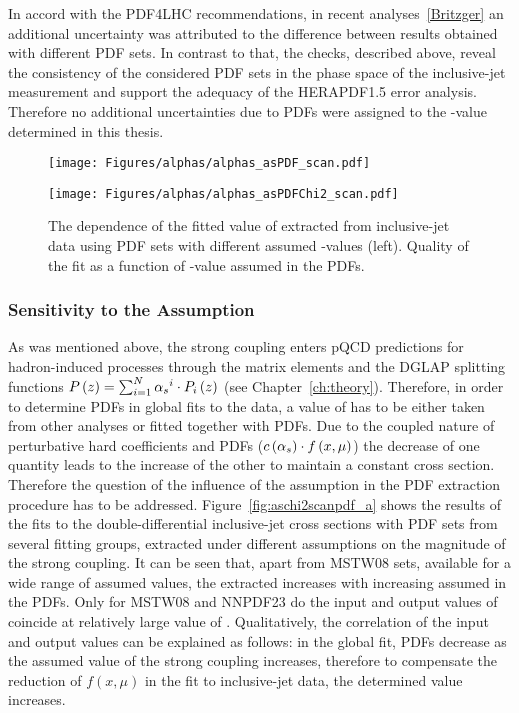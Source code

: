 In accord with the PDF4LHC recommendations, in recent analyses~\ref{Britzger} an additional uncertainty was attributed to the difference between results obtained with different PDF sets. In contrast to that, the checks, described above, reveal the consistency of the considered PDF sets in the phase space of the inclusive-jet measurement and support the adequacy of the HERAPDF1.5 error analysis. Therefore no additional uncertainties due to PDFs were assigned to the \asz-value determined in this thesis. 
\begin{figure}[t]
 \centering
\begin{subfloat}[]{\texttt{[image: Figures/alphas/alphas\_asPDF\_scan.pdf]}
   \label{fig:aschi2scanpdf_a}
 }%
\end{subfloat}
\begin{subfloat}[]{\texttt{[image: Figures/alphas/alphas\_asPDFChi2\_scan.pdf]}
   \label{fig:aschi2scanpdf_b}
 }%
\end{subfloat}
 \caption{The dependence of the fitted value of \asz extracted from inclusive-jet data using PDF sets with different assumed \asz-values (left). Quality of the fit as a function of \asz-value assumed in the PDFs.}
 \label{fig:aschi2scanpdf}
\end{figure}
\subsubsection{Sensitivity to the \asz Assumption}
\label{subsec:asassump}
As was mentioned above, the strong coupling enters pQCD predictions for hadron-induced processes through the matrix elements and the DGLAP splitting functions $P\left(z\right)=\sum_{i=1}^{N}{\mbox{$\alpha_{s}$}^i\cdot P_i\left(z\right)}$ (see Chapter~\ref{ch:theory}). Therefore, in order to determine PDFs in global fits to the data, a value of \asz has to be either taken from other analyses or fitted together with PDFs. Due to the coupled nature of perturbative hard coefficients and PDFs ($c\left(\mbox{$\alpha_{s}$}\right)\cdot f\left(x,\mu\right)$) the decrease of one quantity leads to the increase of the other to maintain a constant cross section. Therefore the question of the influence of the \asz assumption in the PDF extraction procedure has to be addressed. Figure~\ref{fig:aschi2scanpdf_a} shows the results of the \asz fits to the double-differential inclusive-jet cross sections with PDF sets from several fitting groups, extracted under different assumptions on the magnitude of the strong coupling. It can be seen that, apart from MSTW08 sets, available for a wide range of assumed \asz values, the extracted \asz increases with increasing \asz assumed in the PDFs. Only for MSTW08 and NNPDF23 do the input and output values of \asz coincide at relatively large value of \as. Qualitatively, the correlation of the input and output values can be explained as follows: in the global fit, PDFs decrease as the assumed value of the strong coupling increases, therefore to compensate the reduction of $f\left(x,\mu\right)$ in the fit to inclusive-jet data, the determined \asz value increases.

